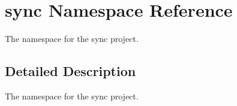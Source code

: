 \hypertarget{namespacesync}{}\section{sync Namespace Reference}
\label{namespacesync}


The namespace for the sync project.  




\subsection{Detailed Description}
The namespace for the sync project. 